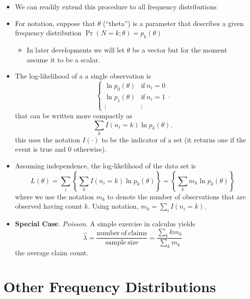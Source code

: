 \documentclass[]{book}
\providecommand{\tightlist}{%
  \setlength{\itemsep}{0pt}\setlength{\parskip}{0pt}}
\theoremstyle{definition}
\theoremstyle{definition}
\theoremstyle{definition}
\theoremstyle{remark}
\begin{document}
\begin{itemize}
\item
  We can readily extend this procedure to all frequency distributions
\item
  For notation, suppose that \(\theta\) (``theta'') is a parameter that
  describes a given frequency distribution
  \(\Pr(N=k; \theta) = p_k(\theta)\)

  \begin{itemize}
  \tightlist
  \item
    In later developments we will let \(\theta\) be a vector but for the
    moment assume it to be a scalar.
  \end{itemize}
\item
  The log-likelihood of a a single observation is \[\left\{
  \begin{array}{ll}
  \ln p_0(\theta) & \mathrm{if}\ n_i=0 \\
  \ln p_1(\theta) & \mathrm{if}\ n_i=1 \\
  \vdots & \vdots
  \end{array}
  \right. .\] that can be written more compactly as
  \[\sum_k I(n_i=k) \ln p_k(\theta).\] this uses the notation
  \(I(\cdot)\) to be the indicator of a set (it returns one if the event
  is true and 0 otherwise).
\item
  Assuming independence, the log-likelihood of the data set is
  \[L(\theta)=\sum_i \left\{ \sum_k I(n_i=k) \ln p_k(\theta) \right\} = \left\{ \sum_k m_k\ln p_k(\theta) \right\}\]
  where we use the notation \(m_k\) to denote the number of observations
  that are observed having count \(k\). Using notation,
  \(m_k = \sum_i I(n_i=k)\).
\item
  \textbf{Special Case}. \emph{Poisson}. A simple exercise in calculus
  yields
  \[\hat{\lambda} =  \frac{\mathrm{number ~of ~claims}}{\mathrm{sample ~size}} = \frac{\sum_k k m_k}{\sum_k  m_k}\]
  the average claim count.
\end{itemize}

\section{Other Frequency
Distributions}\label{other-frequency-distributions}
\end{document}
